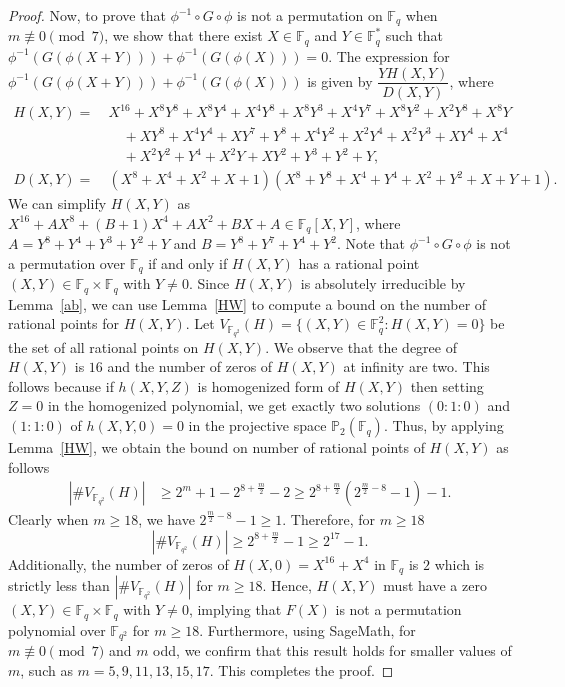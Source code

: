 \documentclass[12pt,reqno]{amsart}
\numberwithin{equation}{section}
\theoremstyle{definition}
\newcommand{\F}{\mathbb F}
\begin{document}
\begin{proof}
Now, to prove that $\phi^{-1} \circ G \circ \phi$ is not a permutation on $\F_q$ when $m\not\equiv 0 \pmod{7}$, we show that there exist  $X \in  \F_{q}$ and $Y \in \F_{q}^{*}$ such that $\phi^{-1}\left(G (\phi(X+Y))\right)  +\phi^{-1}\left(G (\phi(X))\right)=0$. The expression for $\phi^{-1}(G (\phi(X+Y)))+\phi^{-1}(G (\phi(X)))$ is given by $\dfrac{YH(X,Y)}{D(X,Y)}$, where
\begin{align*}
 H(X,Y)=~ & X^{16} + X^8Y^8 + X^8Y^4 + X^4Y^8 + X^8Y^3 + X^4Y^7 + X^8Y^2 + X^2Y^8 + X^8 Y \\&
 \quad + X Y^8+X^4 Y^4 + XY^7  +Y^8+ X^4 Y^2 + X^2 Y^4 + X^2 Y^3 + XY^4 + X^4 \\&
 \quad + X^2Y^2 + Y^4 + X^2Y + XY^2 + Y^3 + Y^2 + Y, \\
D(X,Y) =~ & (X^8+X^4+X^2+X+1)(X^8+Y^8+X^4+Y^4+X^2+Y^2+X+Y+1).
\end{align*}
We can simplify $H(X,Y)$ as $X^{16}+AX^8+(B+1)X^4+AX^2+BX+A \in \F_{q}[X,Y]$, where $A=Y^8+Y^4+Y^3+Y^2+Y$ and $B=Y^8+Y^7+Y^4+Y^2$. Note that $\phi^{-1} \circ G \circ \phi$ is not a permutation over $\F_q$ if and only if $H(X,Y)$ has a rational point $(X,Y) \in \F_{q} \times \F_{q}$ with $Y \neq 0$. Since $H(X,Y)$ is absolutely irreducible by Lemma~\ref{ab}, we can use Lemma~\ref{HW} to compute a bound on the number of rational points for $H(X,Y)$. Let ${V_{\F_{q^2}}(H) = \{ (X, Y) \in \F_{q}^2 : H(X,Y)=0\}}$ be the set of all rational points on $H(X,Y)$. We observe that the degree of $H(X,Y)$ is $16$ and the number of zeros of $H(X,Y)$ at infinity are two. This follows because if $h(X,Y,Z)$ is homogenized form of $H(X,Y)$ then setting $Z=0$ in the homogenized polynomial, we get exactly two solutions $(0:1:0)$ and $(1:1:0)$ of  $h(X,Y,0)=0$ in the projective space $\mathbb{P}_2(\F_{q})$. Thus, by applying Lemma~\ref{HW}, we obtain the bound on number of rational points of $H(X,Y)$ as follows
\begin{align*}
|\#V_{\F_{q^2}}(H)| & \geq 2^m+1-2^{8+\frac{m}{2}}-2\geq  2^{8+\frac{m}{2}}(2^{\frac{m}{2}-8}-1)-1.
\end{align*}
Clearly when $m \geq 18$, we have $2^{\frac{m}{2}-8}-1 \geq 1$. Therefore, for $m \geq 18$ 
$$|\#V_{\F_{q^2}}(H)| \geq  2^{8+\frac{m}{2}}-1 \geq 2^{17}-1.$$
Additionally, the number of zeros of $H(X,0)=X^{16}+X^4$ in $\F_q$ is $2$ which is strictly less than $|\#V_{\F_{q^2}}(H)|$
for $m \geq 18$. Hence, $H(X,Y)$ must have a zero $(X,Y) \in \F_{q}\times \F_{q}$ with $Y \neq 0$, implying that $F(X)$ is not a permutation polynomial over $\F_{q^2}$ for $m \geq 18$. Furthermore, using SageMath, for $m \not \equiv 0 \pmod 7$ and $m$ odd, we confirm that this result holds for smaller values of $m$, such as $m=5,9,11,13,15,17$. This completes the proof.
\end{proof}
\end{document}
